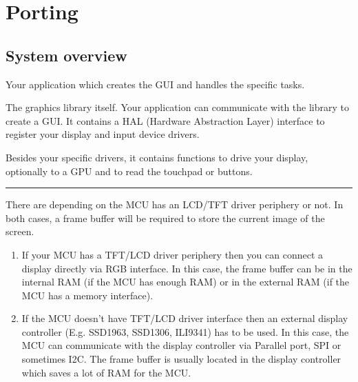 \documentclass[letterpaper,10pt,english]{sphinxmanual}
\begin{document}
\section{Porting}
\label{\detokenize{porting/index:porting}}\label{\detokenize{porting/index::doc}}

\subsection{System overview}
\label{\detokenize{porting/sys:system-overview}}\label{\detokenize{porting/sys::doc}}

Your application which creates the GUI and handles the specific tasks.

The graphics library itself. Your application can communicate with the library to create a GUI. It contains a HAL (Hardware Abstraction Layer) interface to register your display and input device drivers.

Besides your specific drivers, it contains functions to drive your display, optionally to a GPU and to read the touchpad or buttons.


\bigskip\hrule\bigskip


There are  depending on the MCU has an LCD/TFT driver periphery or not. In both cases, a frame buffer will be required to store the current image of the screen.
\begin{enumerate}
\def\theenumi{\arabic{enumi}}
\def\labelenumi{\theenumi .}
\makeatletter\def\p@enumii{\p@enumi \theenumi .}\makeatother
\item {} 
If your MCU has a TFT/LCD driver periphery then you can connect a display directly via RGB interface.
In this case, the frame buffer can be in the internal RAM (if the MCU has enough RAM) or in the external RAM (if the MCU has a memory interface).

\item {} 
If the MCU doesn’t have TFT/LCD driver interface then an external display controller (E.g. SSD1963, SSD1306, ILI9341) has to be used.
In this case, the MCU can communicate with the display controller via Parallel port, SPI or sometimes I2C.
The frame buffer is usually located in the display controller which saves a lot of RAM for the MCU.

\end{enumerate}
\end{document}
